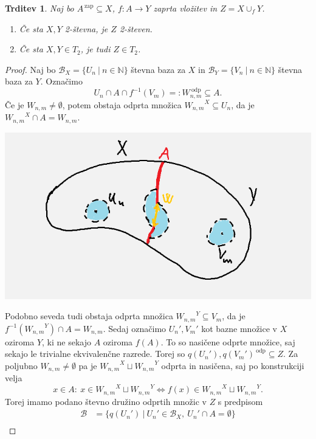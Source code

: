 \documentclass[10pt, a4paper]{article}
\newtheorem{trditev}[izr]{Trditev}
\newenvironment{noticeC}{%
  \tcolorbox[%
  notitle,
  empty,
  enhanced,  %
  breakable,
  coltext=black, 
  fontupper=\rmfamily,
  parbox=false,
  noparskip,
  sharp corners,
  boxrule=-1pt,  %
  frame hidden,
  left=7pt,  %
  right=7pt,
  top=5pt,
  bottom=5pt,
  before skip=2.5ex plus 2pt,
  after skip=2.5ex plus 2pt,
  overlay unbroken and last={%
  },
  ]}
{\endtcolorbox}
\newenvironment{dokaz}%
  {\begin{noticeC}\begin{proof}}%
  {\end{proof}\end{noticeC}}
\newcommand{\N}{\mathbb {N}}
\begin{document}
\begin{trditev}\label{trd:1}
  Naj bo $A^{\,\text{zap}} \subseteq X$, $f: A \to Y$ zaprta vložitev in $Z = X \cup_f Y$.
  \begin{enumerate}
    \item Če sta $X, Y$ 2-števna, je $Z$ 2-števen.
    \item Če sta $X, Y \in T_2$, je tudi $Z \in T_2$. 
  \end{enumerate}
\end{trditev}

\begin{dokaz}
  Naj bo $\mathcal{B}_X = \{U_n\ |\ n \in \N\}$ števna baza za $X$ in 
  $\mathcal{B}_Y = \{V_n\ |\ n \in \N\}$ števna baza za $Y$.
  Označimo $$U_n \cap A \cap f^{-1} (V_m) =: W_{n, m}^{\ \text{odp}} \subseteq A.$$
  Če je $W_{n, m} \neq \emptyset$, potem obstaja odprta množica ${W_{n, m} }^X \subseteq U_n$,
  da je ${W_{n, m} }^X \cap A = W_{n, m}$.
  \begin{center}
    \includegraphics[scale=0.6]{dokaz1.png}
  \end{center}
  Podobno seveda tudi obstaja odprta množica ${W_{n, m} }^Y \subseteq V_m$,
  da je $f^{-1}({W_{n, m} }^Y) \cap A = W_{n, m}$.
  Sedaj označimo $U_n', V_m'$ kot bazne množice v $X$ oziroma $Y$, ki ne sekajo $A$ oziroma 
  $f(A)$. To so nasičene odprte množice, saj sekajo le trivialne ekvivalenčne razrede.
  Torej so $q(U_n'), q(V_m')^{\ \text{odp}} \subseteq Z$.
  Za poljubno $W_{n, m} \neq \emptyset$ pa je ${W_{n, m} }^{X} \sqcup {W_{n, m} }^{Y}$
  odprta in nasičena, saj po konstrukciji velja 
  $$x \in A:\ x \in {W_{n, m} }^{X} \sqcup {W_{n, m} }^{Y} \Leftrightarrow f(x) \in {W_{n, m} }^{X} \sqcup {W_{n, m} }^{Y}.$$
  Torej imamo podano števno družino odprtih množic v $Z$ s predpisom 
  \begin{align*}
    \mathcal{B} &= \{q(U_n')\ |\ U_n' \in \mathcal{B}_X,\ U_n' \cap A = \emptyset\}\\

\end{align*}
\end{dokaz}
\end{document}

